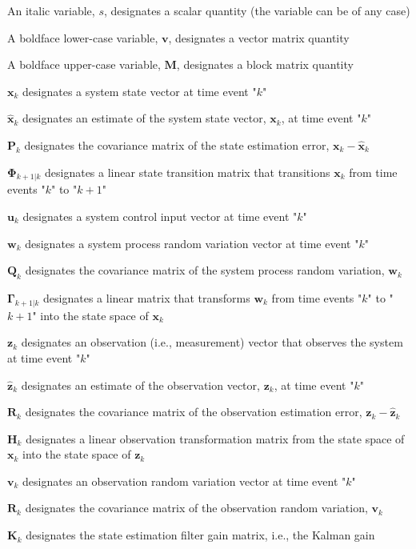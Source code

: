 \documentclass[12pt]{article}
\begin{document}
\begin{myitemize}
    \item An italic variable, $s$, designates a scalar quantity (the variable can be of any case)
    \item A boldface lower-case variable, $\mathbf{v}$, designates a vector matrix quantity
    \item A boldface upper-case variable, $\mathbf{M}$, designates a block matrix quantity
    \item $\mathbf{x}_k$ designates a system state vector at time event "$k$"
    \item $\hat{\mathbf{x}}_k$ designates an estimate of the system state vector, $\mathbf{x}_k$, at time event "$k$"
    \item $\mathbf{P}_k$ designates the covariance matrix of the state estimation error, $\mathbf{x}_k - \hat{\mathbf{x}}_k$
    \item $\mathbf{\Phi}_{k+1|k}$ designates a linear state transition matrix that transitions $\mathbf{x}_k$ from time events "$k$" to "$k+1$"
    \item $\mathbf{u}_k$ designates a system control input vector at time event "$k$"
    \item $\mathbf{w}_k$ designates a system process random variation vector at time event "$k$"
    \item $\mathbf{Q}_k$ designates the covariance matrix of the system process random variation, $\mathbf{w}_k$
    \item $\mathbf{\Gamma}_{k+1|k}$ designates a linear matrix that transforms $\mathbf{w}_k$ from time events "$k$" to "$k+1$" into the state space of $\mathbf{x}_k$
    \item $\mathbf{z}_k$ designates an observation (i.e., measurement) vector that observes the system at time event "$k$"
    \item $\hat{\mathbf{z}}_k$ designates an estimate of the observation vector, $\mathbf{z}_k$, at time event "$k$"
    \item $\mathbf{R}_k$ designates the covariance matrix of the observation estimation error, $\mathbf{z}_k - \hat{\mathbf{z}}_k$
    \item $\mathbf{H}_k$ designates a linear observation transformation matrix from the state space of $\mathbf{x}_k$ into the state space of $\mathbf{z}_k$
    \item $\mathbf{v}_k$ designates an observation random variation vector at time event "$k$"
    \item $\mathbf{R}_k$ designates the covariance matrix of the observation random variation, $\mathbf{v}_k$
    \item $\mathbf{K}_k$ designates the state estimation filter gain matrix, i.e., the Kalman gain
\end{myitemize}
\end{document}
